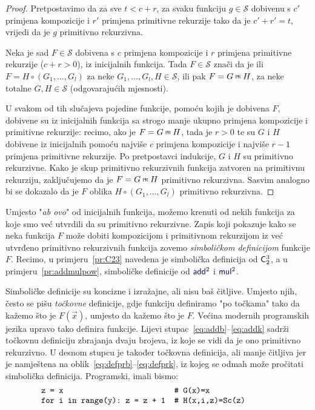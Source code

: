 \begin{proof}
Pretpostavimo da za sve $t<c+r$, za svaku funkciju $g\in\mathcal S$ dobivenu s $c'$ primjena kompozicije i $r'$ primjena primitivne rekurzije tako da je $c'+r'=t$, vrijedi da je $g$ primitivno rekurzivna.

    Neka je sad $F\in\mathcal S$ dobivena s $c$ primjena kompozicije i $r$ primjena primitivne rekurzije ($c+r>0$), iz inicijalnih funkcija. Tada $F\in\mathcal S$ znači da je ili $F=H\circ(G_1,\dotsc,G_l)$ za neke $G_1,\dotsc,G_l,H\in\mathcal S$, ili pak $F=G\pr H$, za neke totalne $G,H\in\mathcal S$ (odgovarajućih mjesnosti).

	U svakom od tih slučajeva pojedine funkcije, pomoću kojih je dobivena $F$, dobivene su iz inicijalnih funkcija sa strogo manje ukupno primjena kompozicije i primitivne rekurzije: recimo, ako je $F=G\pr H$, tada je $r>0$ te su $G$ i $H$ dobivene iz inicijalnih pomoću najviše $c$ primjena kompozicije i najviše $r-1$ primjena primitivne rekurzije. Po pretpostavci indukcije, $G$ i $H$ su primitivno rekurzivne. Kako je skup primitivno rekurzivnih funkcija zatvoren na primitivnu rekurziju, zaključujemo da je $F=G\pr H$ primitivno rekurzivna. Sasvim analogno bi se dokazalo da je $F$ oblika $H\circ(G_1,\dotsc,G_l)$ primitivno rekurzivna.
\end{proof}

\begin{napomena}[{name=[ulančavanje simboličkih definicija]}]\label{nap:symbdef}
Umjesto "\emph{ab ovo}" od inicijalnih funkcija, možemo krenuti od nekih funkcija za koje smo već utvrdili da su primitivno rekurzivne. Zapis koji pokazuje kako se neka funkcija $F$ može dobiti kompozicijom i primitivnom rekurzijom iz već utvrđeno primitivno rekurzivnih funkcija zovemo \emph{simboličkom definicijom} funkcije $F$. Recimo, u primjeru~\ref{pr:C23} navedena je simbolička definicija od $\f C_2^3$, a u primjeru~\ref{pr:addmulpow}, simboličke definicije od $\f{add}^2$ i $\f{mul}^2$.
\end{napomena}

Simboličke definicije su koncizne i izražajne, ali nisu baš čitljive. Umjesto njih, često se pišu \emph{točkovne} definicije, gdje funkciju definiramo "po točkama" tako da kažemo što je $F(\vec x)$, umjesto da kažemo što je $F$. Većina modernih programskih jezika upravo tako definira funkcije. Lijevi stupac~\eqref{eq:addb}--\eqref{eq:addk} sadrži točkovnu definiciju zbrajanja dvaju brojeva, iz koje se vidi da je ono primitivno rekurzivno. U desnom stupcu je također točkovna definicija, ali manje čitljiva jer je namještena na oblik~\eqref{eq:defprb}--\eqref{eq:defprk}, iz kojeg se odmah može pročitati simbolička definicija. Programski, imali bismo:
\begin{equation}
	\begin{minipage}{0.8\textwidth}
		\begin{verbatim}
z = x                         # G(x)=x
for i in range(y): z = z + 1  # H(x,i,z)=Sc(z)
		\end{verbatim}
	\end{minipage}
\end{equation}

